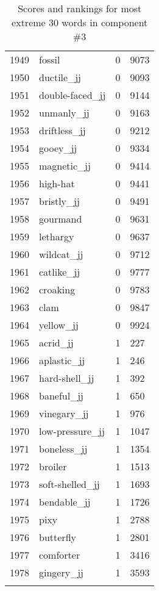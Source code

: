 \begin{longtable}[!htbp]{| rlr@{.}l |}
    1949 & fossil & 0 & 9073 \\
    1950 & ductile\_jj & 0 & 9093 \\
    1951 & double-faced\_jj & 0 & 9144 \\
    1952 & unmanly\_jj & 0 & 9163 \\
    1953 & driftless\_jj & 0 & 9212 \\
    1954 & gooey\_jj & 0 & 9334 \\
    1955 & magnetic\_jj & 0 & 9414 \\
    1956 & high-hat & 0 & 9441 \\
    1957 & bristly\_jj & 0 & 9491 \\
    1958 & gourmand & 0 & 9631 \\
    1959 & lethargy & 0 & 9637 \\
    1960 & wildcat\_jj & 0 & 9712 \\
    1961 & catlike\_jj & 0 & 9777 \\
    1962 & croaking & 0 & 9783 \\
    1963 & clam & 0 & 9847 \\
    1964 & yellow\_jj & 0 & 9924 \\
    1965 & acrid\_jj & 1 & 227 \\
    1966 & aplastic\_jj & 1 & 246 \\
    1967 & hard-shell\_jj & 1 & 392 \\
    1968 & baneful\_jj & 1 & 650 \\
    1969 & vinegary\_jj & 1 & 976 \\
    1970 & low-pressure\_jj & 1 & 1047 \\
    1971 & boneless\_jj & 1 & 1354 \\
    1972 & broiler & 1 & 1513 \\
    1973 & soft-shelled\_jj & 1 & 1693 \\
    1974 & bendable\_jj & 1 & 1726 \\
    1975 & pixy & 1 & 2788 \\
    1976 & butterfly & 1 & 2801 \\
    1977 & comforter & 1 & 3416 \\
    1978 & gingery\_jj & 1 & 3593 \\
    \hline
    \caption{Scores and rankings for most extreme 30 words in component \#3} \\
\end{longtable}
